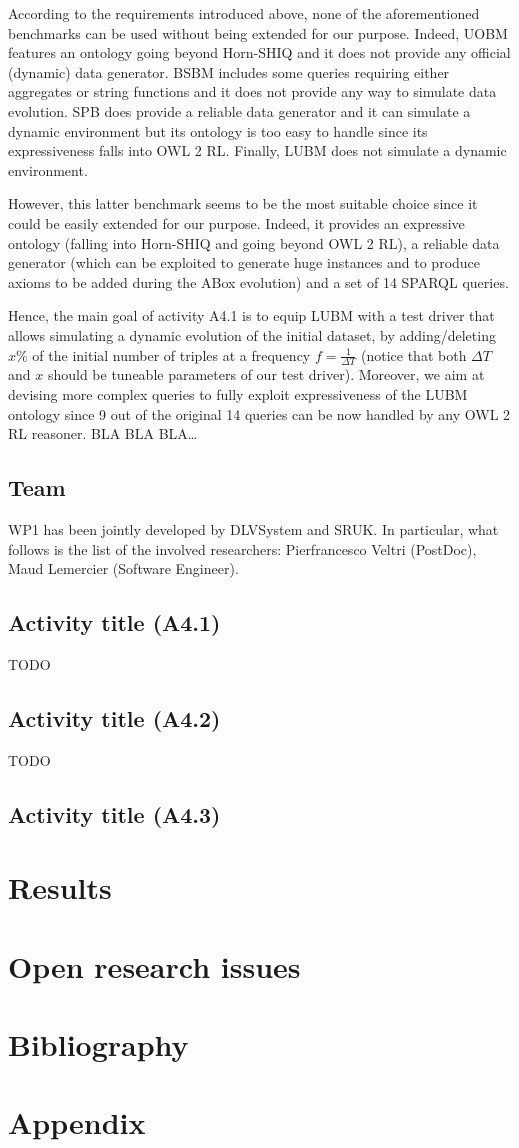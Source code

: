 \documentclass[oneside]{book}
\begin{document}
According to the requirements introduced above, none of the aforementioned benchmarks can be used without being extended for our purpose. Indeed, UOBM features an ontology going beyond Horn-SHIQ and it does not provide any official (dynamic) data generator. BSBM includes some queries requiring either aggregates or string functions and it does not provide any way to simulate data evolution. SPB does provide a reliable data generator and it can simulate a dynamic environment but its ontology is too easy to handle since its expressiveness falls into OWL 2 RL. Finally, LUBM does not simulate a dynamic environment. 

However, this latter benchmark seems to be the most suitable choice since it could be easily extended for our purpose. Indeed, it provides an expressive ontology (falling into Horn-SHIQ and going beyond OWL 2 RL), a reliable data generator (which can be exploited to generate huge instances and to produce axioms to be added during the ABox evolution) and a set of 14 SPARQL queries.


Hence, the main goal of activity A4.1 is to equip LUBM with a test driver that allows simulating a dynamic evolution of the initial dataset, by adding/deleting $x\%$  of the initial number of triples at a frequency $f=\frac{1}{\Delta T}$ (notice that both $\Delta T$ and $x$ should be tuneable parameters of our test driver). Moreover, we aim at devising more complex queries to fully exploit expressiveness of the LUBM ontology since 9 out of the original 14 queries can be now handled by any OWL 2 RL reasoner.
BLA BLA BLA… 


\section{Team}
WP1 has been jointly developed by DLVSystem and SRUK. In particular, what follows is the list of the involved researchers: Pierfrancesco Veltri (PostDoc), Maud Lemercier (Software Engineer).

\section{Activity title (A4.1)}
TODO
\section{Activity title (A4.2)}
TODO
\section{Activity title (A4.3)}


\chapter{Results}
\chapter{Open research issues}
\chapter{Bibliography}
\chapter{Appendix}
\end{document}
